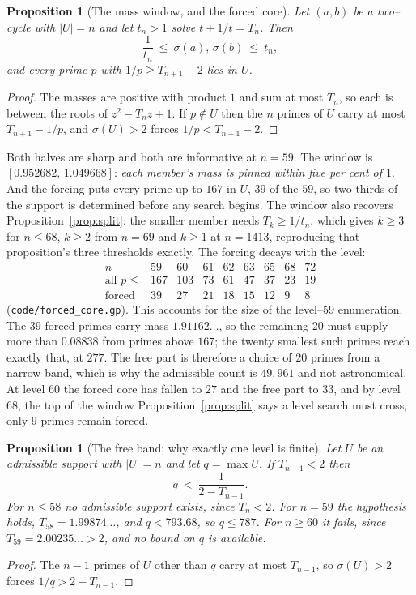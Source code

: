 \documentclass[11pt]{article}
\newtheorem{proposition}[theorem]{Proposition}
\theoremstyle{definition}
\begin{document}
\begin{proposition}[The mass window, and the forced core]\label{prop:window}
Let $(a,b)$ be a two--cycle with $|U|=n$ and let $t_n>1$ solve $t+1/t=T_n$. Then
\[ \frac1{t_n}\ \le\ \sigma(a),\,\sigma(b)\ \le\ t_n, \]
and every prime $p$ with $1/p\ge T_{n+1}-2$ lies in $U$.
\end{proposition}
\begin{proof}
The masses are positive with product $1$ and sum at most $T_n$, so each is between the roots of
$z^2-T_nz+1$. If $p\notin U$ then the $n$ primes of $U$ carry at most $T_{n+1}-1/p$, and
$\sigma(U)>2$ forces $1/p<T_{n+1}-2$.
\end{proof}

Both halves are sharp and both are informative at $n=59$. The window is
$[0.952682,\,1.049668]$: \emph{each member's mass is pinned within five per cent of $1$}. And the
forcing puts every prime up to $167$ in $U$, $39$ of the $59$, so two thirds of the support is
determined before any search begins. The window also recovers
Proposition~\ref{prop:split}: the smaller member needs $T_k\ge1/t_n$, which gives $k\ge3$ for
$n\le68$, $k\ge2$ from $n=69$ and $k\ge1$ at $n=1413$, reproducing that proposition's three
thresholds exactly. The forcing decays with the level:
\[
\begin{array}{l|cccccccc}
n & 59 & 60 & 61 & 62 & 63 & 65 & 68 & 72\\\hline
\text{all }p\le & 167 & 103 & 73 & 61 & 47 & 37 & 23 & 19\\
\text{forced} & 39 & 27 & 21 & 18 & 15 & 12 & 9 & 8
\end{array}
\]
\textup{(\texttt{code/forced\_core.gp})}. This accounts for the size of the level--$59$ enumeration.
The $39$ forced primes carry mass $1.91162\ldots$, so the remaining $20$ must supply more than
$0.08838$ from primes above $167$; the twenty smallest such primes reach exactly that, at $277$. The
free part is therefore a choice of $20$ primes from a narrow band, which is why the admissible count
is $49{,}961$ and not astronomical. At level $60$ the forced core has fallen to $27$ and the free
part to $33$, and by level $68$, the top of the window Proposition~\ref{prop:split} says a level
search must cross, only $9$ primes remain forced.

\begin{proposition}[The free band; why exactly one level is finite]\label{prop:band}
Let $U$ be an admissible support with $|U|=n$ and let $q=\max U$. If $T_{n-1}<2$ then
\[ q\ <\ \frac1{2-T_{n-1}}. \]
For $n\le58$ no admissible support exists, since $T_n<2$. For $n=59$ the hypothesis holds,
$T_{58}=1.99874\ldots$, and $q<793.68$, so $q\le787$. For $n\ge60$ it fails, since
$T_{59}=2.00235\ldots>2$, and no bound on $q$ is available.
\end{proposition}
\begin{proof}
The $n-1$ primes of $U$ other than $q$ carry at most $T_{n-1}$, so $\sigma(U)>2$ forces
$1/q>2-T_{n-1}$.
\end{proof}
\end{document}

